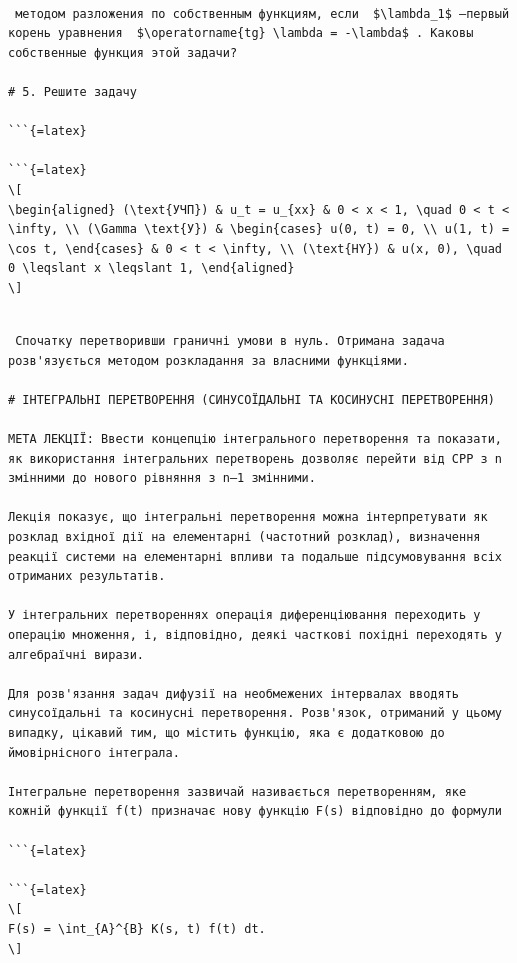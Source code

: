\documentclass[
  ukrainian,
]{article}
\begin{document}
\begin{verbatim}

 методом разложения по собственным функциям, если  $\lambda_1$ —первый корень уравнения  $\operatorname{tg} \lambda = -\lambda$ . Каковы собственные функция этой задачи?

# 5. Решите задачу

```{=latex}

```{=latex}
\[
\begin{aligned} (\text{УЧП}) & u_t = u_{xx} & 0 < x < 1, \quad 0 < t < \infty, \\ (\Gamma \text{У}) & \begin{cases} u(0, t) = 0, \\ u(1, t) = \cos t, \end{cases} & 0 < t < \infty, \\ (\text{HY}) & u(x, 0), \quad 0 \leqslant x \leqslant 1, \end{aligned}
\]
\end{verbatim}

\begin{verbatim}

 Спочатку перетворивши граничні умови в нуль. Отримана задача розв'язується методом розкладання за власними функціями.

# ІНТЕГРАЛЬНІ ПЕРЕТВОРЕННЯ (СИНУСОЇДАЛЬНІ ТА КОСИНУСНІ ПЕРЕТВОРЕННЯ)

МЕТА ЛЕКЦІЇ: Ввести концепцію інтегрального перетворення та показати, як використання інтегральних перетворень дозволяє перейти від CPP з n змінними до нового рівняння з n—1 змінними.

Лекція показує, що інтегральні перетворення можна інтерпретувати як розклад вхідної дії на елементарні (частотний розклад), визначення реакції системи на елементарні впливи та подальше підсумовування всіх отриманих результатів.

У інтегральних перетвореннях операція диференціювання переходить у операцію множення, і, відповідно, деякі часткові похідні переходять у алгебраїчні вирази.

Для розв'язання задач дифузії на необмежених інтервалах вводять синусоїдальні та косинусні перетворення. Розв'язок, отриманий у цьому випадку, цікавий тим, що містить функцію, яка є додатковою до ймовірнісного інтеграла.

Інтегральне перетворення зазвичай називається перетворенням, яке кожній функції f(t) призначає нову функцію F(s) відповідно до формули

```{=latex}

```{=latex}
\[
F(s) = \int_{A}^{B} K(s, t) f(t) dt.
\]
\end{verbatim}
\end{document}
